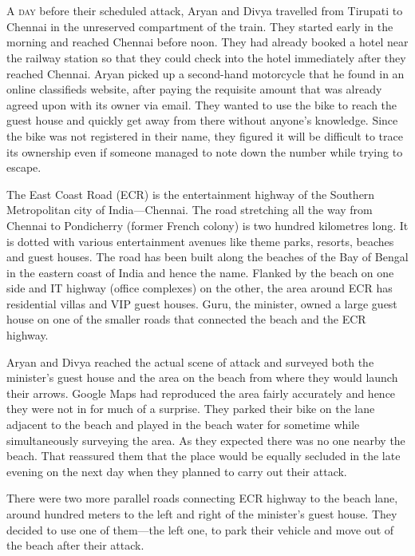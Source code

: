 \chapter{}

\lettrine{A}{ day} before their scheduled attack, Aryan and Divya travelled from Tirupati to
Chennai in the unreserved compartment of the train. They started early in the
morning and reached Chennai before noon. They had already booked a hotel near
the railway station so that they could check into the hotel immediately after
they reached Chennai. Aryan picked up a second-hand motorcycle that he found in
an online classifieds website, after paying the requisite amount that was
already agreed upon with its owner via email. They wanted to use the bike to
reach the guest house and quickly get away from there without anyone's
knowledge. Since the bike was not registered in their name, they figured it will
be difficult to trace its ownership even if someone managed to note down the
number while trying to escape.

The East Coast Road (ECR) is the entertainment highway of the Southern
Metropolitan city of India—Chennai. The road stretching all the way from
Chennai to Pondicherry (former French colony) is two hundred kilometres long. It
is dotted with various entertainment avenues like theme parks, resorts, beaches
and guest houses. The road has been built along the beaches of the Bay of Bengal
in the eastern coast of India and hence the name. Flanked by the beach on one
side and IT highway (office complexes) on the other, the area around ECR has
residential villas and VIP guest houses. Guru, the minister, owned a large guest
house on one of the smaller roads that connected the beach and the ECR highway.

Aryan and Divya reached the actual scene of attack and surveyed both the
minister's guest house and the area on the beach from where they would launch
their arrows. Google Maps had reproduced the area fairly accurately and hence
they were not in for much of a surprise. They parked their bike on the lane
adjacent to the beach and played in the beach water for sometime while
simultaneously surveying the area. As they expected there was no one nearby the
beach. That reassured them that the place would be equally secluded in the late
evening on the next day when they planned to carry out their attack.

There were two more parallel roads connecting ECR highway to the beach lane,
around hundred meters to the left and right of the minister's guest house. They
decided to use one of them—the left one, to park their vehicle and move out of
the beach after their attack.

